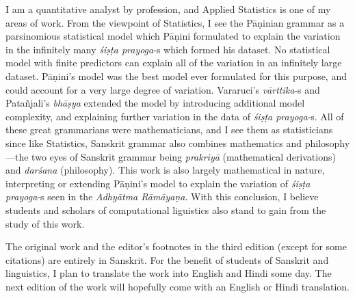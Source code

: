 \begin{sloppypar}\justifying\noindent\hspace{10mm} {\engtextfont I am a quantitative analyst by profession, and Applied Statistics is one of my areas of work. From the viewpoint of Statistics, I see the Pāṇinian grammar as a parsinomious statistical model which Pāṇini formulated to explain the variation in the infinitely many \textit{śiṣṭa prayoga}‑s which formed his dataset. No statistical model with finite predictors can explain all of the variation in an infinitely large dataset. Pāṇini’s model was the best model ever formulated for this purpose, and could account for a very large degree of variation. Vararuci’s \textit{vārttika}‑s and Patañjali’s \textit{bhāṣya} extended the model by introducing additional model complexity, and explaining further variation in the data of \textit{śiṣṭa prayoga}‑s. All of these great grammarians were mathematicians, and I see them as statisticians since like Statistics, Sanskrit grammar also combines mathematics and philosophy—the two eyes of Sanskrit grammar being \textit{prakriyā} (mathematical derivations) and \textit{darśana} (philosophy). This work is also largely mathematical in nature, interpreting or extending Pāṇini’s model to explain the variation of \textit{śiṣṭa prayoga}‑s seen in the \textit{Adhyātma Rāmāyaṇa}. With this conclusion, I believe students and scholars of computational liguistics also stand to gain from the study of this work.}\end{sloppypar}
\begin{sloppypar}\justifying\noindent\hspace{10mm} {\engtextfont The original work and the editor’s footnotes in the third edition (except for some citations) are entirely in Sanskrit. For the benefit of students of Sanskrit and linguistics, I plan to translate the work into English and Hindi some day. The next edition of the work will hopefully come with an English or Hindi translation.}\end{sloppypar}
\vspace{5mm}
\\
\\
